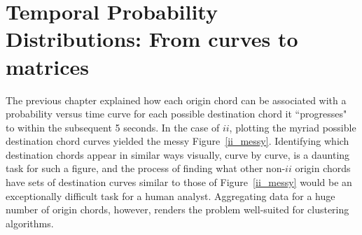 \section{Temporal Probability Distributions: From curves to matrices}
The previous chapter explained how each origin chord can be associated with a probability versus time curve for each possible destination chord it ``progresses" to within the subsequent 5 seconds.  In the case of $ii$, plotting the myriad possible destination chord curves yielded the messy Figure~\ref{ii_messy}.  Identifying which destination chords appear in similar ways visually, curve by curve, is a daunting task for such a figure, and the process of finding what other non-$ii$ origin chords have sets of destination curves similar to those of Figure~\ref{ii_messy} would be an exceptionally difficult task for a human analyst.  Aggregating data for a huge number of origin chords, however, renders the problem well-suited for clustering algorithms.

